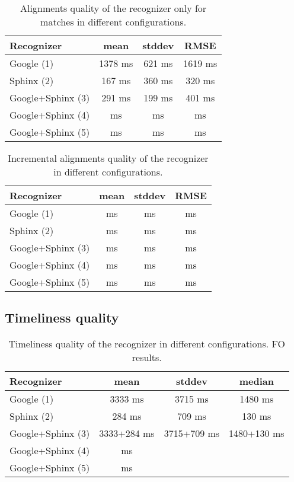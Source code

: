\begin {table}
\label{tab:alignment_non_increm_ms} 
\begin{center}
\caption {Alignments quality of the recognizer only for matches 
in different configurations.}
    \begin{tabular}{l  c  c  c }
   \toprule
    Recognizer & mean & stddev & RMSE \\ \toprule
    Google (1)  & 1378 ms & 621 ms & 1619 ms \\ 
    Sphinx (2)  & 167 ms & 360 ms & 320 ms \\ 
    Google+Sphinx (3)  & 291 ms &  199 ms &  401 ms \\ 
    Google+Sphinx (4)  & ms & ms & ms \\ 
    Google+Sphinx (5)  & ms & ms & ms \\ \bottomrule  
    \end{tabular}
\end{center}
\end {table}
\begin {table}
\label{tab:alignment_non_incr_m} 
\begin{center}
\caption {Incremental alignments quality of the recognizer in different
configurations.}
    \begin{tabular}{ l  c  c  c }
    \toprule
    Recognizer & mean  & stddev & RMSE\\ \toprule
    Google (1)  & ms & ms & ms \\ 
    Sphinx (2)  & ms & ms & ms \\ 
    Google+Sphinx (3)  & ms & ms & ms \\ 
    Google+Sphinx (4)  & ms & ms & ms \\ 
    Google+Sphinx (5)  & ms & ms & ms \\ \bottomrule  
    \end{tabular}
\end{center}
\end {table}
\subsection {Timeliness quality}
\begin {table}
\label{tab:alignment_incr} 
\begin{center}
\caption {Timeliness quality of the recognizer in different configurations. FO
results.}
    \begin{tabular}{ l  c  c  c }
    \toprule
    Recognizer & mean & stddev & median \\ \toprule
    Google (1)  & 3333 ms & 3715 ms &  1480 ms\\
    Sphinx (2)  &284 ms & 709 ms & 130 ms \\
    Google+Sphinx (3)  & 3333+284 ms & 3715+709 ms & 1480+130 ms \\ 
    Google+Sphinx (4)  & ms & & \\ 
    Google+Sphinx (5)  & ms & &  \\ \bottomrule  
    \end{tabular}
\end{center}
\end {table}

